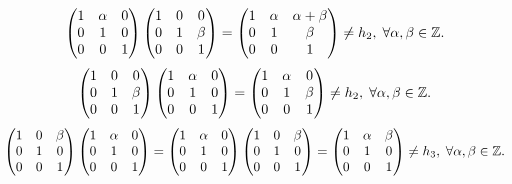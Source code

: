 \documentclass{article}
\begin{document}
\begin{sol}
\begin{description}
\[\begin{pmatrix} 1 & \alpha & 0 \\ 0 & 1 & 0 \\ 0 & 0 & 1\end{pmatrix}\begin{pmatrix} 1 & 0 & 0 \\ 0 & 1 & \beta \\ 0 & 0 & 1 \end{pmatrix}  = \begin{pmatrix} 1 & \alpha & \alpha+\beta \\ 0 & 1 & \beta \\ 0 & 0 & 1 \end{pmatrix} \neq h_{2}, \; \forall \alpha, \beta \in \mathbb{Z}.\]
\[\begin{pmatrix} 1 & 0 & 0 \\ 0 & 1 & \beta \\ 0 & 0 & 1 \end{pmatrix} \begin{pmatrix} 1 & \alpha & 0 \\ 0 & 1 & 0 \\ 0 & 0 & 1\end{pmatrix}=\begin{pmatrix} 1 & \alpha & 0 \\ 0 & 1 & \beta \\ 0 & 0 & 1 \end{pmatrix} \neq h_{2}, \; \forall \alpha, \beta \in \mathbb{Z}.\]
\[\begin{pmatrix} 1 & 0 & \beta \\ 0 & 1 & 0 \\ 0 & 0 & 1 \end{pmatrix}\begin{pmatrix} 1 & \alpha & 0 \\ 0 & 1 & 0 \\ 0 & 0 & 1 \end{pmatrix}=\begin{pmatrix} 1 & \alpha & 0 \\ 0 & 1 & 0 \\ 0 & 0 & 1 \end{pmatrix}\begin{pmatrix} 1 & 0 & \beta \\ 0 & 1 & 0 \\ 0 & 0 & 1 \end{pmatrix} = \begin{pmatrix} 1 & \alpha & \beta \\ 0 & 1 & 0 \\ 0 & 0 & 1 \end{pmatrix} \neq h_{3}, \; \forall \alpha, \beta \in \mathbb{Z}.\]

\end{description}
\end{sol}
\end{document}
